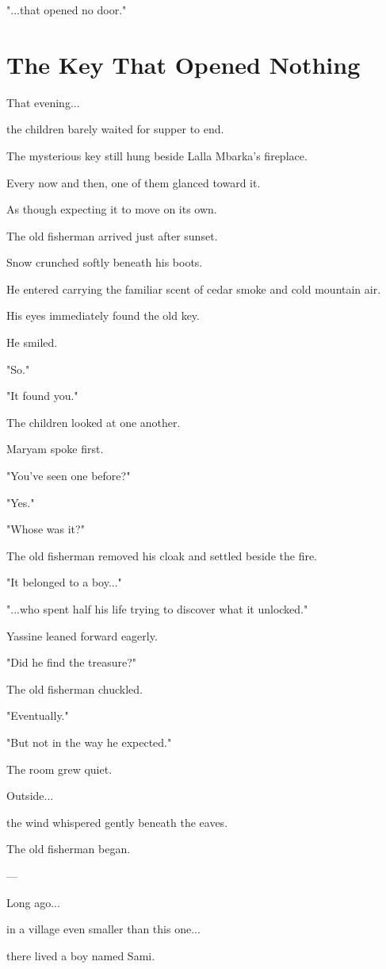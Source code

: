 \documentclass[12pt,openany]{book}
\begin{document}
"...that opened no door."
\section*{The Key That Opened Nothing}

That evening...

the children barely waited for supper to end.

The mysterious key still hung beside Lalla Mbarka's fireplace.

Every now and then, one of them glanced toward it.

As though expecting it to move on its own.

The old fisherman arrived just after sunset.

Snow crunched softly beneath his boots.

He entered carrying the familiar scent of cedar smoke and cold mountain air.

His eyes immediately found the old key.

He smiled.

"So."

"It found you."

The children looked at one another.

Maryam spoke first.

"You've seen one before?"

"Yes."

"Whose was it?"

The old fisherman removed his cloak and settled beside the fire.

"It belonged to a boy..."

"...who spent half his life trying to discover what it unlocked."

Yassine leaned forward eagerly.

"Did he find the treasure?"

The old fisherman chuckled.

"Eventually."

"But not in the way he expected."

The room grew quiet.

Outside...

the wind whispered gently beneath the eaves.

The old fisherman began.

---

Long ago...

in a village even smaller than this one...

there lived a boy named Sami.
\end{document}
